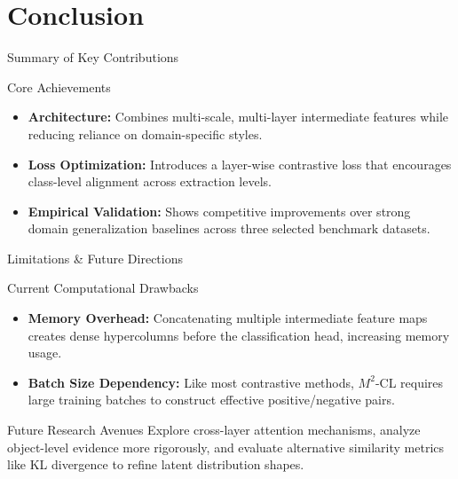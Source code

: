\documentclass[t, aspectratio=169]{beamer} %
\begin{document}
	\section{Conclusion}

	\begin{frame}{Summary of Key Contributions}
		\begin{block}{Core Achievements}
			\begin{itemize}
				\item \textbf{Architecture:} Combines multi-scale, multi-layer intermediate features while reducing reliance on domain-specific styles.
				\item \textbf{Loss Optimization:} Introduces a layer-wise contrastive loss that encourages class-level alignment across extraction levels.
				\item \textbf{Empirical Validation:} Shows competitive improvements over strong domain generalization baselines across three selected benchmark datasets.
			\end{itemize}
		\end{block}
	\end{frame}

	\begin{frame}{Limitations \& Future Directions}
		\begin{block}{Current Computational Drawbacks}
			\begin{itemize}
				\item \textbf{Memory Overhead:} Concatenating multiple intermediate feature maps creates dense hypercolumns before the classification head, increasing memory usage.
				\item \textbf{Batch Size Dependency:} Like most contrastive methods, $M^2$-CL requires large training batches to construct effective positive/negative pairs.
			\end{itemize}
		\end{block}
		\begin{alertblock}{Future Research Avenues}
			Explore cross-layer attention mechanisms, analyze object-level evidence more rigorously, and evaluate alternative similarity metrics like KL divergence to refine latent distribution shapes.
		\end{alertblock}
	\end{frame}

\end{document}
